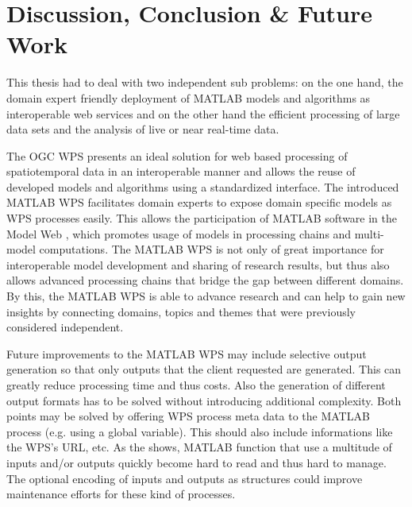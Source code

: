 
\chapter{Discussion, Conclusion \& Future Work}

This thesis had to deal with two independent sub problems: on the one hand, the domain expert friendly deployment of MATLAB models and algorithms as interoperable web services and on the other hand the efficient processing of large data sets and the analysis of live or near real-time data.

The \ac{OGC} \acl{WPS} presents an ideal solution for web based processing of spatiotemporal data in an interoperable manner and allows the reuse of developed models and algorithms using a standardized interface. The introduced MATLAB WPS facilitates domain experts to expose domain specific models as WPS processes easily. This allows the participation of MATLAB software in the Model Web \citep{geller2008looking}, which promotes usage of models in processing chains and multi-model computations. The MATLAB WPS is not only of great importance for interoperable model development and sharing of research results, but thus also allows advanced processing chains that bridge the gap between different domains. By this, the MATLAB WPS is able to advance research and can help to gain new insights by connecting domains, topics and themes that were previously considered independent.

Future improvements to the MATLAB WPS may include selective output generation so that only outputs that the client requested are generated. This can greatly reduce processing time and thus costs. Also the generation of different output formats has to be solved without introducing additional complexity. Both points may be solved by offering WPS process meta data to the MATLAB process (e.g. using a global variable). This should also include informations like the WPS's URL, etc. As the \la shows, MATLAB function that use a multitude of inputs and/or outputs quickly become hard to read and thus hard to manage. The optional encoding of inputs and outputs as structures could improve maintenance efforts for these kind of processes.

